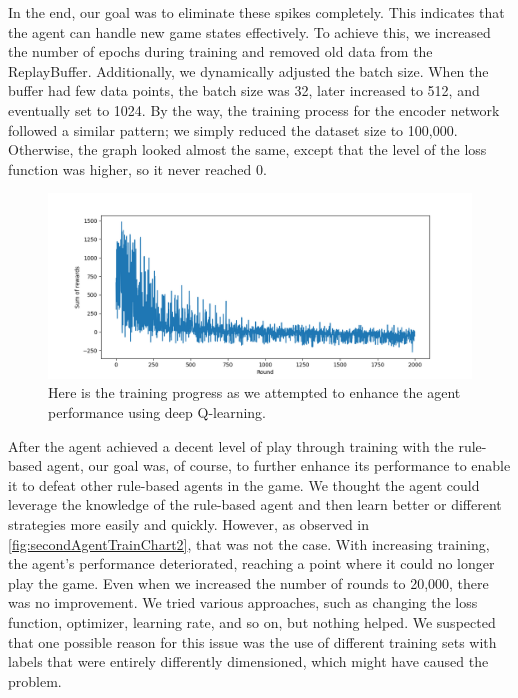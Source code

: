 In the end, our goal was to eliminate these spikes completely. This indicates that the agent can handle new game states effectively. 
To achieve this, we increased the number of epochs during training and removed old data from the ReplayBuffer. Additionally, we dynamically 
adjusted the batch size. When the buffer had few data points, the batch size was 32, later increased to 512, and eventually set to 1024.
By the way, the training process for the encoder network followed a similar pattern; we simply reduced the dataset size to 100,000. Otherwise, 
the graph looked almost the same, except that the level of the loss function was higher, so it never reached 0.

\begin{figure}[H]
    \centering
    
    \includegraphics[width=\oneImgWidth]{images/secondAgentTrainChart2}%
    
    \captionadjust%
    \caption{\label{fig:secondAgentTrainChart2} Here is the training progress as we attempted to enhance the agent performance using deep Q-learning.
    }%
\end{figure}

After the agent achieved a decent level of play through training with the rule-based agent, our goal was, of course, 
to further enhance its performance to enable it to defeat other rule-based agents in the game. We thought the agent could 
leverage the knowledge of the rule-based agent and then learn better or different strategies more easily and quickly. 
However, as observed in \autoref{fig:secondAgentTrainChart2}, that was not the case. With increasing training, the agent's performance deteriorated, 
reaching a point where it could no longer play the game. Even when we increased the number of rounds to 20,000, there was no improvement. 
We tried various approaches, such as changing the loss function, optimizer, learning rate, and so on, but nothing helped. We suspected that 
one possible reason for this issue was the use of different training sets with labels that were entirely 
differently dimensioned, which might have caused the problem.